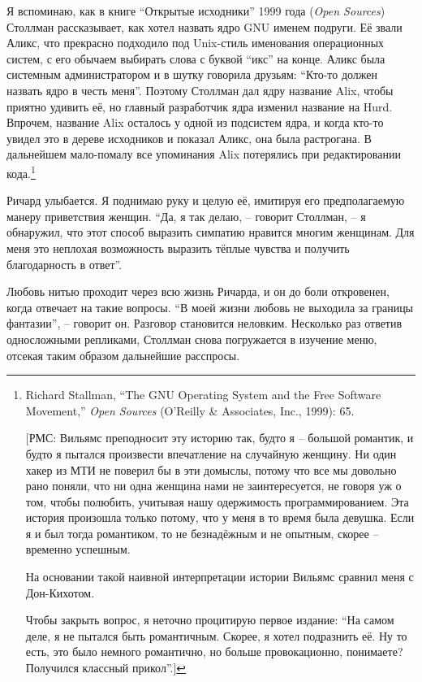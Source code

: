Я вспоминаю, как в книге \enquote{Открытые исходники} 1999 года (\textit{Open Sources}) Столлман рассказывает, как хотел назвать ядро GNU именем подруги. Её звали Аликс, что прекрасно подходило под Unix-стиль именования операционных систем, с его обычаем выбирать слова с буквой \enquote{икс} на конце. Аликс была системным администратором и в шутку говорила друзьям: \enquote{Кто-то должен назвать ядро в честь меня}. Поэтому Столлман дал ядру название Alix, чтобы приятно удивить её, но главный разработчик ядра изменил название на Hurd. Впрочем, название Alix осталось у одной из подсистем ядра, и когда кто-то увидел это в дереве исходников и показал Аликс, она была растрогана. В дальнейшем мало-помалу все упоминания Alix потерялись при редактировании кода.\footnote{Richard Stallman, \enquote{The GNU Operating System and the Free Software Movement,} \textit{Open Sources} (O'Reilly \& Associates, Inc., 1999): 65.

[РМС: Вильямс преподносит эту историю так, будто я -- большой романтик, и будто я пытался произвести впечатление на случайную женщину. Ни один хакер из МТИ не поверил бы в эти домыслы, потому что все мы довольно рано поняли, что ни одна женщина нами не заинтересуется, не говоря уж о том, чтобы полюбить, учитывая нашу одержимость программированием. Эта история произошла только потому, что у меня в то время была девушка. Если я и был тогда романтиком, то не безнадёжным и не опытным, скорее -- временно успешным.

На основании такой наивной интерпретации истории Вильямс сравнил меня с Дон-Кихотом.

Чтобы закрыть вопрос, я неточно процитирую первое издание: \enquote{На самом деле, я не пытался быть романтичным. Скорее, я хотел подразнить её. Ну то есть, это было немного романтично, но больше провокационно, понимаете? Получился классный прикол}.]}

Ричард улыбается. Я поднимаю руку и целую её, имитируя его предполагаемую манеру приветствия женщин. \enquote{Да, я так делаю, -- говорит Столлман, -- я обнаружил, что этот способ выразить симпатию нравится многим женщинам. Для меня это неплохая возможность выразить тёплые чувства и получить благодарность в ответ}.

Любовь нитью проходит через всю жизнь Ричарда, и он до боли откровенен, когда отвечает на такие вопросы. \enquote{В моей жизни любовь не выходила за границы фантазии}, -- говорит он. Разговор становится неловким. Несколько раз ответив односложными репликами, Столлман снова погружается в изучение меню, отсекая таким образом дальнейшие расспросы.

